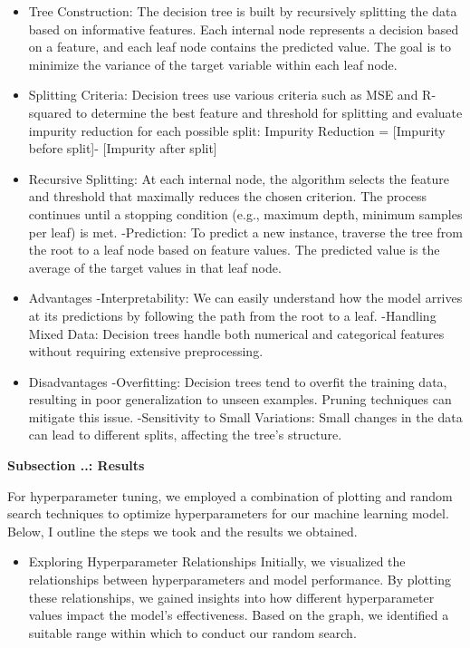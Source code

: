 \documentclass{article}
\newcounter{chapter}
\newcounter{subchapter}[chapter]
\newcounter{subsubchapter}[subchapter]
\renewcommand{\thechapter}{\arabic{chapter}}
\renewcommand{\thesubchapter}{\thechapter.\arabic{subchapter}}
\renewcommand{\thesubsubchapter}{\thesubchapter.\arabic{subsubchapter}}
\newcommand{\mysubsubchapter}[1]{
    \stepcounter{subsubchapter}
    \noindent
    \begin{center}
        \large\bfseries Subsection \thesubsubchapter: #1
    \end{center}
    \vspace{0.25in} %
}
\begin{document}
\begin{itemize}
    \item Tree Construction:
The decision tree is built by recursively splitting the data based on informative features. Each internal node represents a decision based on a feature, and each leaf node contains the predicted value. The goal is to minimize the variance of the target variable within each leaf node.

    \item Splitting Criteria:
Decision trees use various criteria such as MSE and R-squared to determine the best feature and threshold for splitting and evaluate impurity reduction for each possible split:
Impurity Reduction = [Impurity before split]- [Impurity after split]

    \item Recursive Splitting:
At each internal node, the algorithm selects the feature and threshold that maximally reduces the chosen criterion. The process continues until a stopping condition (e.g., maximum depth, minimum samples per leaf) is met.
-Prediction:
To predict a new instance, traverse the tree from the root to a leaf node based on feature values. The predicted value is the average of the target values in that leaf node.

    \item Advantages
-Interpretability: 
We can easily understand how the model arrives at its predictions by following the path from the root to a leaf.
-Handling Mixed Data: 
Decision trees handle both numerical and categorical features without requiring extensive preprocessing.
    \item  Disadvantages
-Overfitting: 
Decision trees tend to overfit the training data, resulting in poor generalization to unseen examples. Pruning techniques can mitigate this issue.
-Sensitivity to Small Variations: 
Small changes in the data can lead to different splits, affecting the tree’s structure.


\end{itemize}


\mysubsubchapter{Results}







For hyperparameter tuning, we employed a combination of plotting and random search techniques to optimize hyperparameters for our machine learning model. Below, I outline the steps we took and the results we obtained.


\begin{itemize}
    \item Exploring Hyperparameter Relationships
Initially, we visualized the relationships between hyperparameters and model performance. By plotting these relationships, we gained insights into how different hyperparameter values impact the model's effectiveness. Based on the graph, we identified a suitable range within which to conduct our random search.

\end{itemize}
\end{document}

